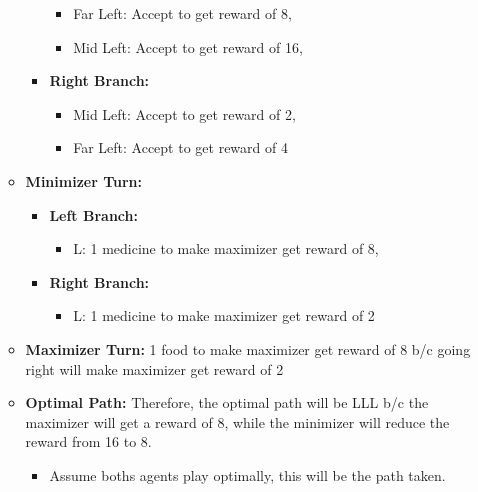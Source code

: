 \begin{example}
\begin{itemize}
\begin{itemize}
\begin{itemize}
\begin{itemize}
                    \item Far Left: Accept to get reward of 8, 
                    \item Mid Left: Accept to get reward of 16, 
                \end{itemize}
                \item \textbf{Right Branch:}
                \begin{itemize}
                    \item Mid Left: Accept to get reward of 2, 
                    \item Far Left: Accept to get reward of 4
                \end{itemize}
            \end{itemize}
            \item \textbf{Minimizer Turn:} 
            \begin{itemize}
                \item \textbf{Left Branch:}
                \begin{itemize}
                    \item L: 1 medicine to make maximizer get reward of 8, 
                \end{itemize}
                \item \textbf{Right Branch:}
                \begin{itemize}
                    \item L: 1 medicine to make maximizer get reward of 2
                \end{itemize}
            \end{itemize}
            \item \textbf{Maximizer Turn:} 1 food to make maximizer get reward of 8 b/c going right will make maximizer get reward of 2
            \item \textbf{Optimal Path:} Therefore, the optimal path will be LLL b/c the maximizer will get a reward of 8, while the minimizer will reduce the reward from 16 to 8.
            \begin{itemize}
                \item Assume boths agents play optimally, this will be the path taken. 
            \end{itemize}
        \end{itemize}
    \end{itemize}
\end{example}
\newpage

\begin{example}
    
\end{example}
\newpage


